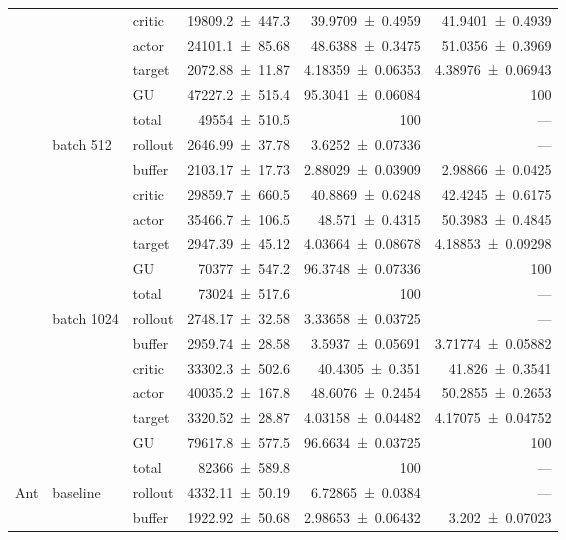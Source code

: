 {\begin{longtable}{@{}lllrrr@{}}
     &  & critic & \num{19809.2+-447.3} & \num{39.9709+-0.4959} & \num{41.9401+-0.4939} \\
     &  & actor & \num{24101.1+-85.68} & \num{48.6388+-0.3475} & \num{51.0356+-0.3969} \\
     &  & target & \num{2072.88+-11.87} & \num{4.18359+-0.06353} & \num{4.38976+-0.06943} \\
     &  & GU & \num{47227.2+-515.4} & \num{95.3041+-0.06084} & 100 \\
     &  & total & \num{49554+-510.5} & \num{100} & --- \\
    \addlinespace[2pt]
     & batch 512 & rollout & \num{2646.99+-37.78} & \num{3.6252+-0.07336} & --- \\
     &  & buffer & \num{2103.17+-17.73} & \num{2.88029+-0.03909} & \num{2.98866+-0.0425} \\
     &  & critic & \num{29859.7+-660.5} & \num{40.8869+-0.6248} & \num{42.4245+-0.6175} \\
     &  & actor & \num{35466.7+-106.5} & \num{48.571+-0.4315} & \num{50.3983+-0.4845} \\
     &  & target & \num{2947.39+-45.12} & \num{4.03664+-0.08678} & \num{4.18853+-0.09298} \\
     &  & GU & \num{70377+-547.2} & \num{96.3748+-0.07336} & 100 \\
     &  & total & \num{73024+-517.6} & \num{100} & --- \\
    \addlinespace[2pt]
     & batch 1024 & rollout & \num{2748.17+-32.58} & \num{3.33658+-0.03725} & --- \\
     &  & buffer & \num{2959.74+-28.58} & \num{3.5937+-0.05691} & \num{3.71774+-0.05882} \\
     &  & critic & \num{33302.3+-502.6} & \num{40.4305+-0.351} & \num{41.826+-0.3541} \\
     &  & actor & \num{40035.2+-167.8} & \num{48.6076+-0.2454} & \num{50.2855+-0.2653} \\
     &  & target & \num{3320.52+-28.87} & \num{4.03158+-0.04482} & \num{4.17075+-0.04752} \\
     &  & GU & \num{79617.8+-577.5} & \num{96.6634+-0.03725} & 100 \\
     &  & total & \num{82366+-589.8} & \num{100} & --- \\
    \addlinespace[2pt]
    \midrule
    Ant & baseline & rollout & \num{4332.11+-50.19} & \num{6.72865+-0.0384} & --- \\
     &  & buffer & \num{1922.92+-50.68} & \num{2.98653+-0.06432} & \num{3.202+-0.07023} \\

\end{longtable}}

